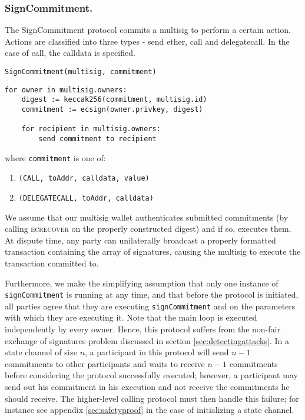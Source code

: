 \documentclass[prb,floatfix,reprint,nofootinbib,amsmath,amssymb,epsfig,pre,floats,letterpaper,groupedaffiliation,tightenlines,allcolors=blue,11pt]{revtex4}
\theoremstyle{definition}
\theoremstyle{definition}
\theoremstyle{definition}
\begin{document}
\subsubsection{SignCommitment.} The SignCommitment protocol commits a multisig to perform a certain action. Actions are classified into three types - send ether, call and delegatecall. In the case of call, the calldata is specified.

\vspace{1.5em}
\begin{protocol}{\texttt{SignCommitment(multisig, commitment)}}
\begin{lstlisting}
for owner in multisig.owners:
    digest := keccak256(commitment, multisig.id)
    commitment := ecsign(owner.privkey, digest)

    for recipient in multisig.owners:
        send commitment to recipient
\end{lstlisting}
\end{protocol}
\vspace{1.5em}

where \texttt{commitment} is one of:

\begin{enumerate}
\setlength\itemsep{0em}
\item \texttt{(CALL, toAddr, calldata, value)}
\item \texttt{(DELEGATECALL, toAddr, calldata)}
\end{enumerate}

We assume that our multisig wallet authenticates submitted commitments (by calling \textsc{ecrecover} on the properly constructed digest) and if so, executes them. At dispute time, any party can unilaterally broadcast a properly formatted transaction containing the array of signatures, causing the multisig to execute the transaction committed to.

Furthermore, we make the simplifying assumption that only one instance of \texttt{signCommitment} is running at any time, and that before the protocol is initiated, all parties agree that they are executing \texttt{signCommitment} and on the parameters with which they are executing it. Note that the main loop is executed independently by every owner. Hence, this protocol suffers from the non-fair exchange of signatures problem discussed in section \ref{sec:detectingattacks}. In a state channel of size $n$, a participant in this protocol will send $n-1$ commitments to other participants and waits to receive $n-1$ commitments before considering the protocol successfully executed; however, a participant may send out his commitment in his execution and not receive the commitments he should receive. The higher-level calling protocol must then handle this failure; for instance see appendix \ref{sec:safetyproof} in the case of initializing a state channel.
\end{document}
